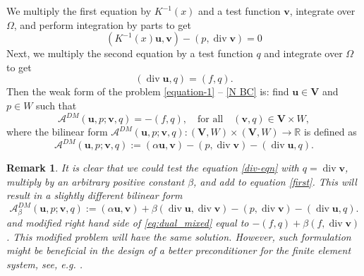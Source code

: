 \documentclass[11pt]{amsart}
\numberwithin{equation}{section}
\newtheorem{remark}{Remark}[section]
\theoremstyle{definition}\newtheorem{example}{Example}[section]
\begin{document}
We multiply the first equation by $K^{-1}(x)$ and 
a test function $ {{\mathbf v}}$,  integrate over ${{\Omega}}$, and perform integration by parts to get
\begin{equation}\label{first}
(K^{-1}(x) {{\mathbf u}}, {{\mathbf v}}) - (p, {\operatorname{div}} {{\mathbf v}}) = 0
\end{equation}
Next, we  multiply the second equation by a test function
$q$ and integrate over ${{\Omega}}$ to get
\begin{equation}\label{div-eqn}
({\operatorname{div}} {{\mathbf u}}, q)=(f,q).
\end{equation}
Then the weak form of  the problem \eqref{equation-1} -- \eqref{N BC}
 is: find  ${{\mathbf u}} \in {{\boldsymbol V}}$ and $p \in W$ such that
\begin{equation}\label{eq:dual_mixed}
{{\mathcal A}}^{DM}({{\mathbf u}},p; {{\mathbf v}},q)= - (f, q),
\quad \mbox{for all}\quad ({{\mathbf v}}, q) \in {{\boldsymbol V}} \times W,
\end{equation}
where the bilinear form 
${{\mathcal A}}^{DM}({{\mathbf u}},p; {{\mathbf v}},q): ({{\boldsymbol V}}, W)  \times ( {{\boldsymbol V}}, W) \to {\mathbb{R}}$ is defined as
\begin{equation}\label{A-form-mixed}
{{\mathcal A}}^{DM}({{\mathbf u}},p; {{\mathbf v}},q):=({{\alpha}} {{\mathbf u}}, {{\mathbf v}})
-(p, {\operatorname{div}} {{\mathbf v}}) - ({\operatorname{div}} {{\mathbf u}}, q). 
\end{equation}

\begin{remark}
It is clear that we could test the equation \eqref{div-eqn} 
with $q={\operatorname{div}} {{\mathbf v}}$, multiply 
by an arbitrary positive constant  $\beta$, and add to 
equation \eqref{first}. This will result in a slightly different bilinear form
$$
{{\mathcal A}}^{DM}_\beta ({{\mathbf u}},p; {{\mathbf v}},q)
:=({{\alpha}} {{\mathbf u}}, {{\mathbf v}}) + \beta ({\operatorname{div}} {{\mathbf u}}, {\operatorname{div}} {{\mathbf v}})-(p, {\operatorname{div}} {{\mathbf v}}) - ({\operatorname{div}} {{\mathbf u}}, q). 
$$
and modified right hand side of \eqref{eq:dual_mixed} equal to $ - (f,
q) + \beta ( f, {\operatorname{div}} {{\mathbf v}})$.  This modified problem will have the same
solution. However, such formulation might be beneficial in the design
of a better preconditioner for the finite element system, see,
e.g. \cite{vassilevski1996preconditioning}.
\end{remark}
\end{document}
